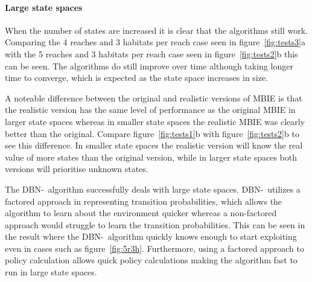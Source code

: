\paragraph{Large state spaces}
When the number of states are increased it is clear that the algorithms still
work. Comparing the 4 reaches and 3 habitats per reach case seen in
figure~\ref{fig:tests3}a with the 5 reaches and 3 habitats per reach case seen
in figure~\ref{fig:tests2}b this can be seen. The algorithms do still improve
over time although taking longer time to converge, which is expected as the
state space increases in size. 

A noteable difference between the original and realistic versions of MBIE is
that the realistic version has the same level of performance as the original
MBIE in larger state spaces whereas in smaller state spaces the realistic MBIE
was clearly better than the original. Compare figure~\ref{fig:tests1}b with
figure~\ref{fig:tests2}b to see this difference. In smaller state spaces the
realistic version will know the real value of more states than the original
version, while in larger state spaces both versions will prioritise unknown
states.

The DBN-\etre\ algorithm successfully deals with large state spaces. DBN-\etre\
utilizes a factored approach in representing transition probabilities, which
allows the algorithm to learn about the environment quicker whereas a
non-factored approach would struggle to learn the transition probabilities.
This can be seen in the result where the DBN-\etre\ algorithm quickly knows
enough to start exploiting even in cases such as figure~\ref{fig:5r3h}.
Furthermore, using a factored approach to policy calculation allows quick
policy calculations making the algorithm fast to run in large state spaces.
